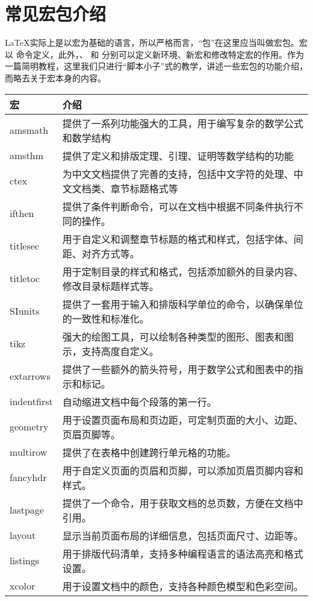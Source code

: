 \part{常见宏包介绍}
\LaTeX 实际上是以宏为基础的语言，所以严格而言，“包”在这里应当叫做宏包。宏以 命令定义，此外，、 和 分别可以定义新环境、新宏和修改特定宏的作用。作为一篇简明教程，这里我们只进行“脚本小子”式的教学，讲述一些宏包的功能介绍，而略去关于宏本身的内容。
\begin{center}
	\begin{longtable}{C{1.8cm}|L{13cm}}
		\hline
		宏 & 介绍\\
		\hline
		amsmath&提供了一系列功能强大的工具，用于编写复杂的数学公式和数学结构\\
		amsthm&提供了定义和排版定理、引理、证明等数学结构的功能\\
		ctex&为中文文档提供了完善的支持，包括中文字符的处理、中文文档类、章节标题格式等\\
		ifthen&提供了条件判断命令，可以在文档中根据不同条件执行不同的操作。\\
		titlesec&用于自定义和调整章节标题的格式和样式，包括字体、间距、对齐方式等。\\
		titletoc&用于定制目录的样式和格式，包括添加额外的目录内容、修改目录标题样式等。\\
		SIunits&提供了一套用于输入和排版科学单位的命令，以确保单位的一致性和标准化。\\
		tikz&强大的绘图工具，可以绘制各种类型的图形、图表和图示，支持高度自定义。\\
		extarrows&提供了一些额外的箭头符号，用于数学公式和图表中的指示和标记。\\
		indentfirst&自动缩进文档中每个段落的第一行。\\
		geometry&用于设置页面布局和页边距，可定制页面的大小、边距、页眉页脚等。\\
		multirow&提供了在表格中创建跨行单元格的功能。\\
		fancyhdr&用于自定义页面的页眉和页脚，可以添加页眉页脚内容和样式。\\
		lastpage&提供了一个命令，用于获取文档的总页数，方便在文档中引用。\\
		layout&显示当前页面布局的详细信息，包括页面尺寸、边距等。\\
		listings&用于排版代码清单，支持多种编程语言的语法高亮和格式设置。\\
		xcolor&用于设置文档中的颜色，支持各种颜色模型和色彩空间。\\

\end{longtable}
\end{center}
